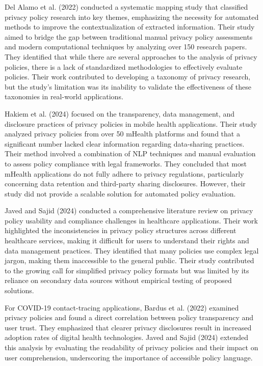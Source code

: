 \documentclass[conference]{IEEEtran}
\begin{document}
    Del Alamo et al. (2022)\cite{del_alamo_systematic_2022} conducted a systematic mapping study that classified privacy policy research into key themes, emphasizing the necessity for automated methods to improve the contextualization of extracted information. Their study aimed to bridge the gap between traditional manual privacy policy assessments and modern computational techniques by analyzing over 150 research papers. They identified that while there are several approaches to the analysis of privacy policies, there is a lack of standardized methodologies to effectively evaluate policies. Their work contributed to developing a taxonomy of privacy research, but the study's limitation was its inability to validate the effectiveness of these taxonomies in real-world applications.

Hakiem et al. (2024)\cite{hakiem_security_2024} focused on the transparency, data management, and disclosure practices of privacy policies in mobile health applications. Their study analyzed privacy policies from over 50 mHealth platforms and found that a significant number lacked clear information regarding data-sharing practices. Their method involved a combination of NLP techniques and manual evaluation to assess policy compliance with legal frameworks. They concluded that most mHealth applications do not fully adhere to privacy regulations, particularly concerning data retention and third-party sharing disclosures. However, their study did not provide a scalable solution for automated policy evaluation.

Javed and Sajid (2024)\cite{javed_systematic_2025} conducted a comprehensive literature review on privacy policy usability and compliance challenges in healthcare applications. Their work highlighted the inconsistencies in privacy policy structures across different healthcare services, making it difficult for users to understand their rights and data management practices. They identified that many policies use complex legal jargon, making them inaccessible to the general public. Their study contributed to the growing call for simplified privacy policy formats but was limited by its reliance on secondary data sources without empirical testing of proposed solutions.

For COVID-19 contact-tracing applications, Bardus et al. (2022)\cite{bardus_data_2022} examined privacy policies and found a direct correlation between policy transparency and user trust. They emphasized that clearer privacy disclosures result in increased adoption rates of digital health technologies. Javed and Sajid (2024)\cite{javed_systematic_2025} extended this analysis by evaluating the readability of privacy policies and their impact on user comprehension, underscoring the importance of accessible policy language.
\end{document}
